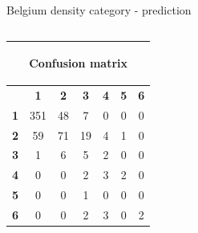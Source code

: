 \documentclass[c]{beamer}
\begin{document}
\begin{frame}
\begin{columns}
\begin{column}{0.5\textwidth}
\begin{overlayarea}{\linewidth}{4cm}
  \end{overlayarea}
  \begin{overlayarea}{\linewidth}{0.5cm}
    \centering
    \tiny Belgium density category - prediction\par
  \end{overlayarea}
 \end{column}
\end{columns}
\begin{columns}
 \begin{column}{0.6\textwidth}
 \begin{overlayarea}{\linewidth}{2cm}
  \begin{table}
  \begin{center}
  \begin{adjustbox}{max width=0.6\textwidth}
  {\tiny
  \begin{tabular}{|c|c|c|c|c|c|c|}
    \hline
    \multicolumn{7}{|c|}{{\tiny \begin{bf}Confusion matrix\end{bf}}} \\
    \hline
     & \textbf{1} & \textbf{2} & \textbf{3} & \textbf{4} & \textbf{5} & \textbf{6}\\
    \hline
    \textbf{1} & 351 & 48 & 7 & 0 & 0 & 0\\
    \hline
    \textbf{2} & 59 & 71 & 19 & 4 & 1 & 0\\
    \hline
    \textbf{3} & 1 & 6 & 5 & 2 & 0 & 0\\
    \hline
    \textbf{4} & 0 & 0 & 2 & 3 & 2 & 0\\
    \hline
    \textbf{5} & 0 & 0 & 1 & 0 & 0 & 0\\
    \hline
    \textbf{6} & 0 & 0 & 2 & 3 & 0 & 2\\
    \hline
  \end{tabular}
  }
  \end{adjustbox}
  \end{center}
  \end{table}
 \end{overlayarea}
 \end{column}
 \begin{column}{0.6\textwidth}

\end{column}
\end{columns}
\end{frame}
\end{document}
